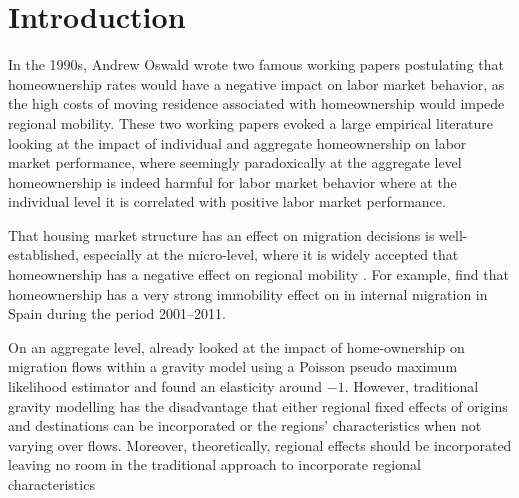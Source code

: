 \documentclass[fleqn,10pt]{SelfArx} %
\affiliation{\textsuperscript{1}\textit{Department of Spatial Economics, Vrije Universiteit Amsterdam, Amsterdam, The Netherlands}} %
\affiliation{*\textbf{Corresponding author}: \Letter{} t.de.graaff@vu.n; \Mundus{} \href{thomasdegraaff.nl}{thomasdegraaff.nl}} %
\begin{document}
	
	\flushbottom %
	\maketitle %
	\thispagestyle{empty} %
	
	
	\section{Introduction} %

        In the 1990s, Andrew Oswald wrote two famous working papers
        \citep{oswald1996conjecture, oswald1999housing} postulating
        that homeownership rates would have a negative impact on labor
        market behavior, as the high costs of moving residence
        associated with homeownership would impede regional
        mobility. These two working papers evoked a large empirical
        literature \citep[see, e.g., ][]{munch2006homeowners,
          munch2008home, de2013european} looking at the impact of
        individual and aggregate homeownership on labor market
        performance, where seemingly paradoxically at the aggregate
        level homeownership is indeed harmful for labor market
        behavior where at the individual level it is correlated with
        positive labor market performance.

        That housing market structure has an effect on migration
        decisions is well-established, especially at the micro-level,
        where it is widely accepted that homeownership has a negative
        effect on regional mobility \citep{dietz2003social}. For
        example, \citet{palomares2018understanding} find that
        homeownership has a very strong immobility effect on in
        internal migration in Spain during the period 2001--2011.

        On an aggregate level, \citet{amirault2016drags} already
        looked at the impact of home-ownership on migration flows
        within a gravity model using a Poisson pseudo maximum
        likelihood estimator and found an elasticity around
        $-1$. However, traditional gravity modelling has the
        disadvantage that either regional fixed effects of origins and
        destinations can be incorporated or the regions'
        characteristics when not varying over flows. Moreover,
        theoretically, regional effects should be incorporated leaving
        no room in the traditional approach to incorporate regional characteristics
\end{document}
